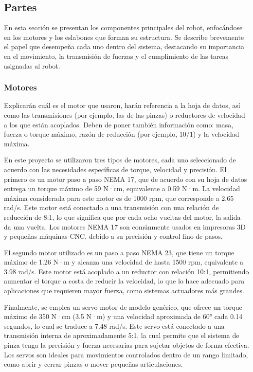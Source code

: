 \subsection{Partes} \label{subsec:partes}
En esta sección se presentan los componentes principales del robot, enfocándose en los motores y los eslabones que forman su estructura. Se describe brevemente el papel que desempeña cada uno dentro del sistema, destacando su importancia en el movimiento, la transmisión de fuerzas y el cumplimiento de las tareas asignadas al robot.


\subsubsection{Motores} \label{subsubsec:motores}
Explicarán cuál es el motor que usaron, harán referencia a la hoja de datos, así como las transmisiones (por ejemplo, las de las pinzas) o reductores de velocidad a los que están acoplados. Deben de poner también información como: masa, fuerza o torque máximo, razón de reducción (por ejemplo, 10/1) y la velocidad máxima.

En este proyecto se utilizaron tres tipos de motores, cada uno seleccionado de acuerdo con las necesidades específicas de torque, velocidad y precisión. El primero es un motor paso a paso NEMA 17, que de acuerdo con su hoja de datos entrega un torque máximo de 59 N·cm, equivalente a 0.59 N·m. La velocidad máxima considerada para este motor es de 1000 rpm, que corresponde a 2.65 rad/s. Este motor está conectado a una transmisión con una relación de reducción de 8:1, lo que significa que por cada ocho vueltas del motor, la salida da una vuelta. Los motores NEMA 17 son comúnmente usados en impresoras 3D y pequeñas máquinas CNC, debido a su precisión y control fino de pasos.

El segundo motor utilizado es un paso a paso NEMA 23, que tiene un torque máximo de 1.26 N·m y alcanza una velocidad de hasta 1500 rpm, equivalente a 3.98 rad/s. Este motor está acoplado a un reductor con relación 10:1, permitiendo aumentar el torque a costa de reducir la velocidad, lo que lo hace adecuado para aplicaciones que requieren mayor fuerza, como sistemas actuadores más grandes.

Finalmente, se emplea un servo motor de modelo genérico, que ofrece un torque máximo de 350 N·cm (3.5 N·m) y una velocidad aproximada de 60° cada 0.14 segundos, lo cual se traduce a 7.48 rad/s. Este servo está conectado a una transmisión interna de aproximadamente 5:1, la cual permite que el sistema de pinza tenga la precisión y fuerza necesarias para sujetar objetos de forma efectiva. Los servos son ideales para movimientos controlados dentro de un rango limitado, como abrir y cerrar pinzas o mover pequeñas articulaciones.


